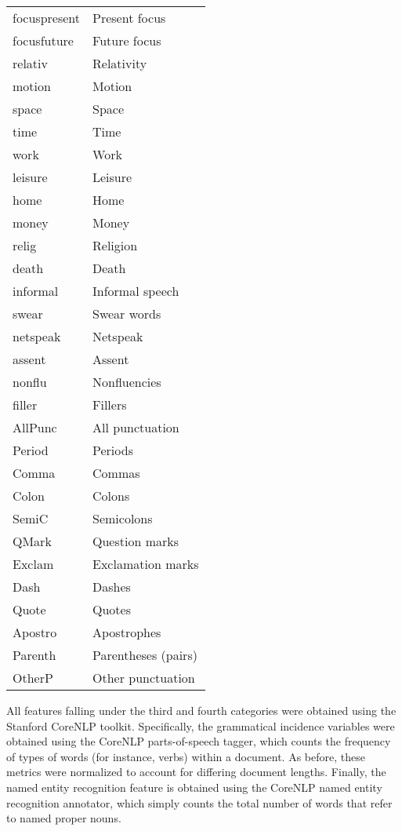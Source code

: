 \documentclass[../thesis.tex]{subfiles}
\begin{document}
\begin{longtable}[t]{ll}
focuspresent & Present focus\\
focusfuture & Future focus\\
\addlinespace
relativ & Relativity\\
motion & Motion\\
space & Space\\
time & Time\\
work & Work\\
\addlinespace
leisure & Leisure\\
home & Home\\
money & Money\\
relig & Religion\\
death & Death\\
\addlinespace
informal & Informal speech\\
swear & Swear words\\
netspeak & Netspeak\\
assent & Assent\\
nonflu & Nonfluencies\\
\addlinespace
filler & Fillers\\
AllPunc & All punctuation\\
Period & Periods\\
Comma & Commas\\
Colon & Colons\\
\addlinespace
SemiC & Semicolons\\
QMark & Question marks\\
Exclam & Exclamation marks\\
Dash & Dashes\\
Quote & Quotes\\
\addlinespace
Apostro & Apostrophes\\
Parenth & Parentheses (pairs)\\
OtherP & Other punctuation\\
\bottomrule
\end{longtable}

All features falling under the third and fourth categories were obtained using the Stanford CoreNLP toolkit. Specifically, the grammatical incidence variables were obtained using the CoreNLP parts-of-speech tagger, which counts the frequency of types of words (for instance, verbs) within a document. As before, these metrics were normalized to account for differing document lengths. Finally, the named entity recognition feature is obtained using the CoreNLP named entity recognition annotator, which simply counts the total number of words that refer to named proper nouns.
\end{document}
